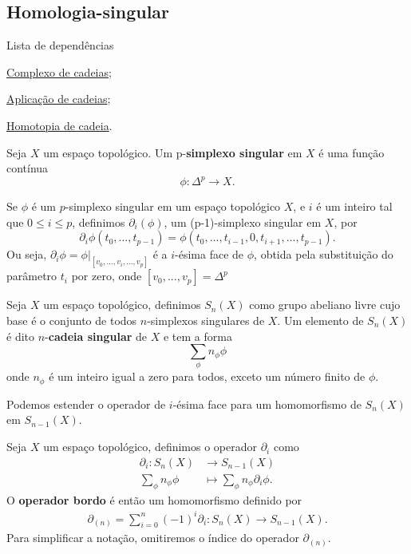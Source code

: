 \subsection{Homologia-singular} %
\label{homologia-singular-def}
\begin{titlemize}{Lista de dependências}
	\item \hyperref[complexo-de-cadeias-def]{Complexo de cadeias};\\ 
    \item \hyperref[aplicacao-de-cadeias-def]{Aplicação de cadeias};\\
    \item \hyperref[homotopia-de-cadeias-def]{Homotopia de cadeia}.\\
\end{titlemize}

\begin{defi}
    Seja $X$ um espaço topológico. Um p-\textbf{simplexo singular} em $X$ é uma função contínua 
    \[\phi:\Delta^p\longrightarrow X.\]
\end{defi}

\begin{defi}
    Se $\phi$ é um $p$-simplexo singular em um espaço topológico $X$, e $i$ é um inteiro tal que $0\le i\le p$, definimos $\partial_i (\phi)$, um (p-1)-simplexo singular em $X$, por 
    \[\partial_i \phi(t_0,...,t_{p-1})=\phi(t_0,...,t_{i-1},0,t_{i+1},...,t_{p-1}).\]
    Ou seja, $\partial_i \phi=\phi|_{[v_0,...,\widehat{v_i},...,v_{p}]}$ é a $i$-ésima face de $\phi$, obtida pela substituição do parâmetro $t_i$ por zero, onde $[v_0,...,v_p]=\Delta^p$
\end{defi}

\begin{defi}
    Seja $X$ um espaço topológico, definimos $S_n(X)$ como grupo abeliano livre cujo base é o conjunto de todos $n$-simplexos singulares de $X$. Um elemento de $S_n(X)$ é dito $n$-\textbf{cadeia singular} de $X$ e tem a forma 
    \[\sum_\phi n_\phi \phi\]
    onde $n_\phi$ é um inteiro igual a zero para todos, exceto um número finito de $\phi$.
\end{defi}

Podemos estender o operador de $i$-ésima face para um homomorfismo de $S_n(X)$ em $S_{n-1} (X)$. 

\begin{defi}
    Seja $X$ um espaço topológico, definimos o operador $\partial_i$ como
    \begin{align*}
        \partial_i: S_n(X)&\longrightarrow S_{n-1}(X)\\
        \sum_\phi n_\phi \phi&\longmapsto \sum_\phi n_\phi \partial_i\phi.
    \end{align*}
    O \textbf{operador bordo} é então um homomorfismo definido por
    \begin{align*}
        \partial_{(n)}=\sum_{i=0}^n (-1)^i \partial_i:S_n(X)\longrightarrow S_{n-1}(X).
    \end{align*}
    Para simplificar a notação, omitiremos o índice do operador $\partial_{(n)}$.
\end{defi}

